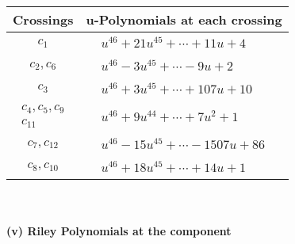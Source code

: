 \documentclass[1p]{elsarticle_modified}
\theoremstyle{definition}
\begin{document}
\begin{tabular}{m{50pt}|m{274pt}}
Crossings & \hspace{64pt}u-Polynomials at each crossing \\
\hline $$\begin{aligned}c_{1}\end{aligned}$$&$\begin{aligned}
&u^{46}+21 u^{45}+\cdots+11 u+4
\end{aligned}$\\
\hline $$\begin{aligned}c_{2},c_{6}\end{aligned}$$&$\begin{aligned}
&u^{46}-3 u^{45}+\cdots-9 u+2
\end{aligned}$\\
\hline $$\begin{aligned}c_{3}\end{aligned}$$&$\begin{aligned}
&u^{46}+3 u^{45}+\cdots+107 u+10
\end{aligned}$\\
\hline $$\begin{aligned}c_{4},c_{5},c_{9}\\c_{11}\end{aligned}$$&$\begin{aligned}
&u^{46}+9 u^{44}+\cdots+7 u^2+1
\end{aligned}$\\
\hline $$\begin{aligned}c_{7},c_{12}\end{aligned}$$&$\begin{aligned}
&u^{46}-15 u^{45}+\cdots-1507 u+86
\end{aligned}$\\
\hline $$\begin{aligned}c_{8},c_{10}\end{aligned}$$&$\begin{aligned}
&u^{46}+18 u^{45}+\cdots+14 u+1
\end{aligned}$\\
\hline
\end{tabular}\\~\\
\newpage\renewcommand{\arraystretch}{1}
\flushleft \textbf{(v) Riley Polynomials at the component}\newline \\
\end{document}
